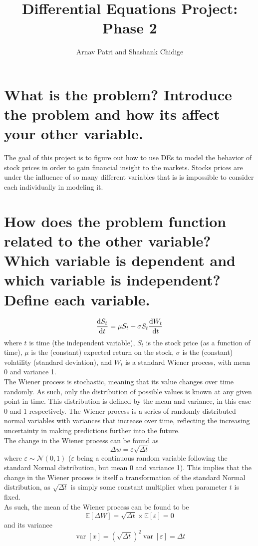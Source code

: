 \documentclass[12pt, A4]{article}
\title{Differential Equations Project: Phase 2}
\author{Arnav Patri and Shashank Chidige}
\newcommand{\Exp}{\mathbb{E}}
\newcommand{\ndist}{\mathcal{N}}
\DeclareMathOperator{\vari}{var}
\begin{document}
	\maketitle
		\section{What is the problem? Introduce the problem and how its affect your other variable.}
			The goal of this project is to figure out how to use DEs to model the behavior of stock prices in order to gain financial insight to the markets. Stocks prices are under the influence of so many different variables that is is impossible to consider each individually in modeling it. 
		\section{How does the problem function related to the other variable? Which variable is dependent and which variable is independent? Define each variable.}
			\[\dv{S_t}{t} = \mu S_t + \sigma S_t\dv{W_t}{t}\]
				where \(t\) is time (the independent variable), \(S_t\) is the stock price (as a function of time), \(\mu\) is the (constant) expected return on the stock, \(\sigma\) is the (constant) volatility (standard deviation), and \(W_t\) is a standard Wiener process, with mean 0 and variance 1. \\
			The Wiener process is stochastic, meaning that its value changes over time randomly. As such, only the distribution of possible values is known at any given point in time. This distribution is defined by the mean and variance, in this case 0 and 1 respectively. The Wiener process is a series of randomly distributed normal variables with variances that increase over time, reflecting the increasing uncertainty in making predictions further into the future. \\
			The change in the Wiener process can be found as
				\[\Delta w = \varepsilon\sqrt{\Delta t}\]
				where \(\varepsilon \sim \ndist(0, 1)\) (\(\varepsilon\) being a continuous random variable following the standard Normal distribution, but mean 0 and variance 1). This implies that the change in the Wiener process is itself a transformation of the standard Normal distribution, as \(\sqrt{\Delta t}\) is simply some constant multiplier when parameter \(t\) is fixed. \\
				As such, the mean of the Wiener process can be found to be
					\[\Exp[\Delta W] = \sqrt{\Delta t} \times \Exp[\varepsilon] = 0\]
				and its variance
					\[\vari[x] = \left(\sqrt{\Delta t}\right)^2\vari[\varepsilon] = \Delta t\]
\end{document}

